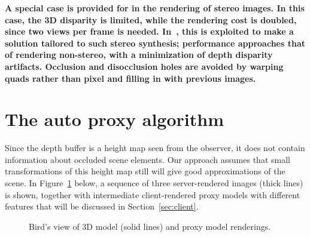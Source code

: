 \documentclass[10pt,conference,compsocconf]{IEEEtran}
\newcommand{\ie}{{\em i.e.}}
\newcommand{\etal}{{\em et~al.}}
\begin{document}
%
\textbf{A special case is provided for in the rendering of stereo images. In
  this case, the 3D disparity is limited, while the rendering cost is doubled,
  since two views per frame is needed. In~\cite{DidykERMS2010}, this is
  exploited to make a solution tailored to such stereo synthesis; performance
  approaches that of rendering non-stereo, with a minimization of depth
  disparity artifacts. Occlusion and disocclusion holes are avoided by warping quads rather than
  pixel and filling in with previous images.}
%







\section{The auto proxy algorithm}

Since the depth buffer is a height map seen from the observer, it
does not contain information about occluded scene elements. Our approach assumes
that small transformations of this height map still will give good
approximations of the scene. In Figure~\ref{fig:2DheightmapRotated} below, a
sequence of three server-rendered images (thick lines) is shown, together with
intermediate client-rendered proxy models with different features that will be
discussed in Section~\ref{sec:client}.

\begin{figure}[htb]
  \centering
  \caption{\label{fig:2DheightmapRotated}
Bird's view of 3D model (solid lines) and proxy model renderings.
}
\end{figure}

\end{document}
